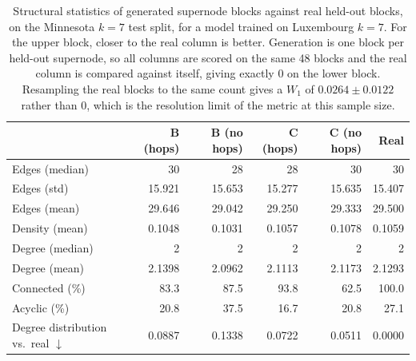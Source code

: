 \begin{table}[H]
\centering
\caption{Structural statistics of generated supernode blocks against real
held-out blocks, on the Minnesota $k{=}7$ test split, for a model trained on
Luxembourg $k{=}7$. For the upper block, closer to the real column is
better. Generation is one block per held-out supernode, so all columns are
scored on the same 48 blocks and the real column is compared against
itself, giving exactly $0$ on the lower block. Resampling the real blocks to
the same count gives a $W_1$ of $0.0264 \pm 0.0122$ rather
than $0$, which is the resolution limit of the metric at this sample size.}
\label{tab:dintra-lux2minn-k7-stats}
\begin{tabular}{lrrrrr}
\toprule
 & B (hops) & B (no hops) & C (hops) & C (no hops) & Real \\
\midrule
Edges (median)                     & 30 & 28 & 28 & 30 & 30 \\
Edges (std)                        & 15.921 & 15.653 & 15.277 & 15.635 & 15.407 \\
Edges (mean)                       & 29.646 & 29.042 & 29.250 & 29.333 & 29.500 \\
Density (mean)                     & 0.1048 & 0.1031 & 0.1057 & 0.1078 & 0.1059 \\
Degree (median)                    & 2 & 2 & 2 & 2 & 2 \\
Degree (mean)                      & 2.1398 & 2.0962 & 2.1113 & 2.1173 & 2.1293 \\
Connected (\%)                     & 83.3 & 87.5 & 93.8 & 62.5 & 100.0 \\
Acyclic (\%)                       & 20.8 & 37.5 & 16.7 & 20.8 & 27.1 \\
\midrule
Degree distribution vs.\ real $\downarrow$ & 0.0887 & 0.1338 & 0.0722 & 0.0511 & 0.0000 \\
\bottomrule
\end{tabular}
\end{table}
